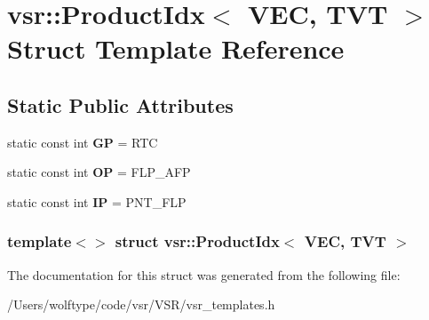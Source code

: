 \hypertarget{structvsr_1_1_product_idx_3_01_v_e_c_00_01_t_v_t_01_4}{\section{vsr\-:\-:Product\-Idx$<$ V\-E\-C, T\-V\-T $>$ Struct Template Reference}
\label{structvsr_1_1_product_idx_3_01_v_e_c_00_01_t_v_t_01_4}
}
\subsection*{Static Public Attributes}
\begin{DoxyCompactItemize}
\item 
\hypertarget{structvsr_1_1_product_idx_3_01_v_e_c_00_01_t_v_t_01_4_ae6163543d8e56560fed969f158181d53}{static const int {\bfseries G\-P} = R\-T\-C}\label{structvsr_1_1_product_idx_3_01_v_e_c_00_01_t_v_t_01_4_ae6163543d8e56560fed969f158181d53}

\item 
\hypertarget{structvsr_1_1_product_idx_3_01_v_e_c_00_01_t_v_t_01_4_a71b5ce8c5fb6bd40587b131665e5cb01}{static const int {\bfseries O\-P} = F\-L\-P\-\_\-\-A\-F\-P}\label{structvsr_1_1_product_idx_3_01_v_e_c_00_01_t_v_t_01_4_a71b5ce8c5fb6bd40587b131665e5cb01}

\item 
\hypertarget{structvsr_1_1_product_idx_3_01_v_e_c_00_01_t_v_t_01_4_a4e9878b20083b14ab426f6d2f3ae1998}{static const int {\bfseries I\-P} = P\-N\-T\-\_\-\-F\-L\-P}\label{structvsr_1_1_product_idx_3_01_v_e_c_00_01_t_v_t_01_4_a4e9878b20083b14ab426f6d2f3ae1998}

\end{DoxyCompactItemize}
\subsubsection*{template$<$$>$ struct vsr\-::\-Product\-Idx$<$ V\-E\-C, T\-V\-T $>$}



The documentation for this struct was generated from the following file\-:\begin{DoxyCompactItemize}
\item 
/\-Users/wolftype/code/vsr/\-V\-S\-R/vsr\-\_\-templates.\-h\end{DoxyCompactItemize}
